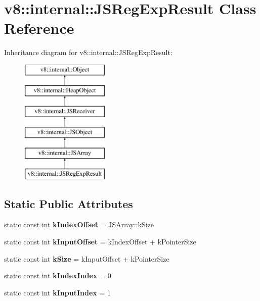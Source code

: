 \hypertarget{classv8_1_1internal_1_1_j_s_reg_exp_result}{}\section{v8\+:\+:internal\+:\+:J\+S\+Reg\+Exp\+Result Class Reference}
\label{classv8_1_1internal_1_1_j_s_reg_exp_result}
Inheritance diagram for v8\+:\+:internal\+:\+:J\+S\+Reg\+Exp\+Result\+:\begin{figure}[H]
\begin{center}
\leavevmode
\includegraphics[height=6.000000cm]{classv8_1_1internal_1_1_j_s_reg_exp_result}
\end{center}
\end{figure}
\subsection*{Static Public Attributes}
\begin{DoxyCompactItemize}
\item 
\hypertarget{classv8_1_1internal_1_1_j_s_reg_exp_result_a0e1056c3ef480c83d8c00cca5f5c68cf}{}static const int {\bfseries k\+Index\+Offset} = J\+S\+Array\+::k\+Size\label{classv8_1_1internal_1_1_j_s_reg_exp_result_a0e1056c3ef480c83d8c00cca5f5c68cf}

\item 
\hypertarget{classv8_1_1internal_1_1_j_s_reg_exp_result_a061bea65d9c9d770c109386aa3482d61}{}static const int {\bfseries k\+Input\+Offset} = k\+Index\+Offset + k\+Pointer\+Size\label{classv8_1_1internal_1_1_j_s_reg_exp_result_a061bea65d9c9d770c109386aa3482d61}

\item 
\hypertarget{classv8_1_1internal_1_1_j_s_reg_exp_result_add2f94b506eee3084d490de4c67a3bef}{}static const int {\bfseries k\+Size} = k\+Input\+Offset + k\+Pointer\+Size\label{classv8_1_1internal_1_1_j_s_reg_exp_result_add2f94b506eee3084d490de4c67a3bef}

\item 
\hypertarget{classv8_1_1internal_1_1_j_s_reg_exp_result_a1a10ad481cbf4e7bb27b376d827155ea}{}static const int {\bfseries k\+Index\+Index} = 0\label{classv8_1_1internal_1_1_j_s_reg_exp_result_a1a10ad481cbf4e7bb27b376d827155ea}

\item 
\hypertarget{classv8_1_1internal_1_1_j_s_reg_exp_result_a4f1188f12cec956861acdbfbaf20fe8b}{}static const int {\bfseries k\+Input\+Index} = 1\label{classv8_1_1internal_1_1_j_s_reg_exp_result_a4f1188f12cec956861acdbfbaf20fe8b}

\end{DoxyCompactItemize}

